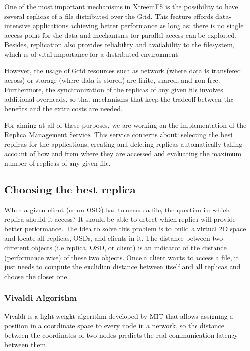 
One of the most important mechanisms in XtreemFS is the possibility to have
several replicas of a file distributed over the Grid. This feature affords
data-intensive applications achieving better performance as long as: there is no
single access point for the data and mechanisms for parallel access can be
exploited. Besides, replication also provides reliability and availability to
the filesystem, which is of vital importance for a distributed environment.

However, the usage of Grid resources such as network (where data is transfered
across) or storage (where data is stored) are finite, shared, and non-free.
Furthermore, the synchronization of the replicas of any given file involves
additional overheads, so that mechanisms that keep the tradeoff between the
benefits and the extra costs are needed.

For aiming at all of these purposes, we are working on the implementation of the
Replica Management Service. This service concerns about: selecting the best
replicas for the applications, creating and deleting replicas automatically
taking account of how and from where they are accessed and evaluating the
maximum number of replicas of any given file.


\subsection{Choosing the best replica}
\label{RMS_Choosing_Replicas}

When a given client (or an OSD) has to access a file, the question is: which
replica should it access? It should be able to detect which replica will provide
better performance. The idea to solve this problem is to build a virtual 2D
space and locate all replicas, OSDs, and clients in it. The distance
between two different objects (i.e replica, OSD, or client) is an indicator of
the distance (performance wise) of these two objects. Once a client wants to
access a file, it just needs to compute the euclidian distance between itself
and all replicas and choose the closer one.

\subsubsection{Vivaldi Algorithm}

Vivaldi is a light-weight algorithm developed by MIT \cite{dabek2004vdn} 
that allows assigning a position in a coordinate space to every node in a network,
so the distance between the coordinates of two nodes predicts the real communication
latency between them.

